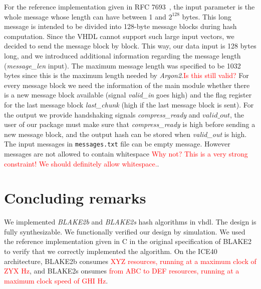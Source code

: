\documentclass[%
	a4paper,
]
{article}
\newcommand{\todo}[1]{\textcolor{red}{#1}}
\begin{document}
For the reference implementation given in RFC 7693~\autocite{rfc7693},
the input parameter is the whole message whose length can have between 1
and $2^{128}$ bytes.
%
This long message is intended to be divided into 128-byte message blocks
during hash computation. Since the VHDL cannot support such large input
vectors, we decided to send the message block by block.
%
This way, our data input is 128 bytes long, and we introduced additional
information regarding the message length (\emph{message_len} input).
%
The maximum message length was specified to be 1032 bytes since this is the
maximum length needed by \emph{Argon2}.\todo{Is this still valid?}
%
For every message block we need the information of the main module whether there
is a new message block available (signal \emph{valid_in} goes high) and the flag
register for the last message block \emph{last_chunk} (high if the last message
block is sent).
%
For the output we provide handshaking signals \emph{compress_ready}
and $valid\_out$, the user of our package must make sure that
\emph{compress_ready} is high before sending a new message block, and the
output hash can be stored when \emph{valid_out} is high.
%
The input messages in \texttt{messages.txt} file can be empty message. However
messages are not allowed to contain whitespace \todo{Why not? This is a very
strong constraint! We should definitely allow whitespace.}.
%
\section{Concluding remarks}
\label{sec:conclusding-remarks}

We implemented \emph{BLAKE2b} and \emph{BLAKE2s} hash algorithms in \gls{vhdl}.
The design is fully synthesizable. We functionally verified our design by
simulation. We used the reference implementation given in C in the original
specification of BLAKE2~\autocite{rfc7693} to verify that we correctly
implemented the algorithm. On the ICE40 architecture, BLAKE2b consumes
\todo{XYZ resources, running at a maximum clock of ZYX Hz}, and BLAKE2s
onsumes \todo{from ABC to DEF resources, running at a maximum clock speed of
GHI Hz}.
%
%
%
\printbibliography
%
%
\end{document}
